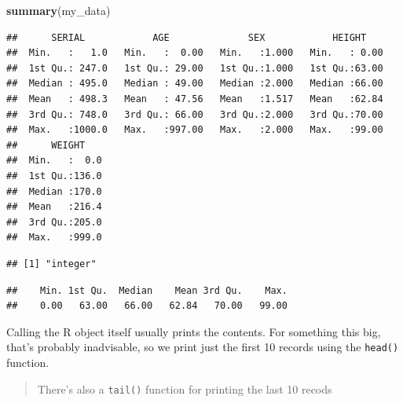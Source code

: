 \documentclass[
]{book}
\newenvironment{Shaded}{\begin{snugshade}}{\end{snugshade}}
\newcommand{\FunctionTok}[1]{\textcolor[rgb]{0.13,0.29,0.53}{\textbf{#1}}}
\newcommand{\NormalTok}[1]{#1}
\newcommand{\SpecialCharTok}[1]{\textcolor[rgb]{0.81,0.36,0.00}{\textbf{#1}}}
\begin{document}
\begin{Shaded}
\begin{Highlighting}[]
\FunctionTok{summary}\NormalTok{(my\_data)}
\end{Highlighting}
\end{Shaded}

\begin{verbatim}
##      SERIAL            AGE              SEX            HEIGHT     
##  Min.   :   1.0   Min.   :  0.00   Min.   :1.000   Min.   : 0.00  
##  1st Qu.: 247.0   1st Qu.: 29.00   1st Qu.:1.000   1st Qu.:63.00  
##  Median : 495.0   Median : 49.00   Median :2.000   Median :66.00  
##  Mean   : 498.3   Mean   : 47.56   Mean   :1.517   Mean   :62.84  
##  3rd Qu.: 748.0   3rd Qu.: 66.00   3rd Qu.:2.000   3rd Qu.:70.00  
##  Max.   :1000.0   Max.   :997.00   Max.   :2.000   Max.   :99.00  
##      WEIGHT     
##  Min.   :  0.0  
##  1st Qu.:136.0  
##  Median :170.0  
##  Mean   :216.4  
##  3rd Qu.:205.0  
##  Max.   :999.0
\end{verbatim}

\begin{Shaded}
\end{Shaded}

\begin{verbatim}
## [1] "integer"
\end{verbatim}

\begin{Shaded}
\end{Shaded}

\begin{verbatim}
##    Min. 1st Qu.  Median    Mean 3rd Qu.    Max. 
##    0.00   63.00   66.00   62.84   70.00   99.00
\end{verbatim}

Calling the R object itself usually prints the contents. For something this big, that's probably inadvisable, so we print just the first 10 records using the \texttt{head()} function.

\begin{quote}
There's also a \texttt{tail()} function for printing the last 10 recods
\end{quote}
\end{document}
